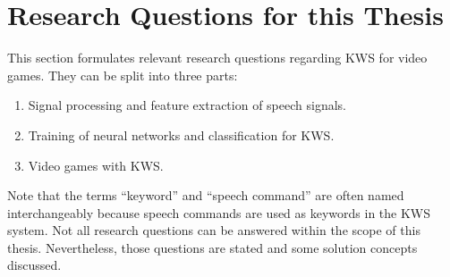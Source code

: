 
\section{Research Questions for this Thesis}\label{sec:intro_rq}
This section formulates relevant research questions regarding KWS for video games.
They can be split into three parts:
\begin{enumerate}[label={Q.\arabic*)}, leftmargin=1.4cm]
  \item Signal processing and feature extraction of speech signals.
  \item Training of neural networks and classification for KWS.
  \item Video games with KWS.
\end{enumerate}
Note that the terms \enquote{keyword} and \enquote{speech command} are often named interchangeably because speech commands are used as keywords in the KWS system.
Not all research questions can be answered within the scope of this thesis.
Nevertheless, those questions are stated and some solution concepts discussed.



